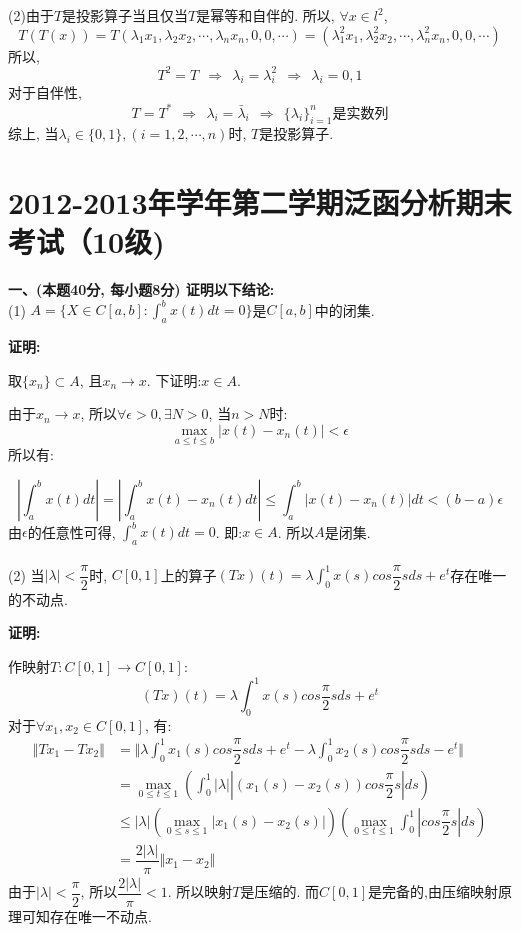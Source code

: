 \documentclass{article}
\begin{document}
(2)由于$T$是投影算子当且仅当$T$是幂等和自伴的. 所以, $\forall x \in l^2$,
$$ T(T(x)) = T(\lambda_1x_1, \lambda_2x_2, \cdots, \lambda_nx_n, 0, 0, \cdots) = (\lambda_1^2x_1, \lambda_2^2x_2, \cdots, \lambda_n^2x_n, 0, 0, \cdots) $$
所以, 
$$T^2 = T \ \ \Rightarrow \ \ \lambda_i = \lambda_i^2 \ \ \Rightarrow \ \ \lambda_i = 0, 1 $$
对于自伴性, 
$$ T = T^* \ \ \Rightarrow \ \ \lambda_i = \bar{\lambda}_i \ \ \Rightarrow \ \ \{\lambda_i \}_{i=1}^n\text{是实数列} $$
综上, 当$\lambda_i \in \{0, 1\}, (i=1,2, \cdots, n)$时, $T$是投影算子. 

\newpage



\section{2012-2013年学年第二学期泛函分析期末考试（10级)}
\textbf{一、(本题40分, 每小题8分) 证明以下结论:}  \\

(1) $A = \{ X\in C[a,b]: \int_a^b x(t)dt=0 \}$是$C[a,b]$中的闭集. 

\textbf{证明:}

取$\{ x_n \} \subset A$, 且$x_n \rightarrow x$. 下证明:$x \in A$.

由于$x_n \rightarrow x$, 所以$\forall \epsilon>0, \exists N>0$, 当$n>N$时:
 $$\max\limits_{ a \leq t \leq b} |x(t) - x_n(t)| < \epsilon$$
所以有:

$$ |\int_a^b x(t)dt| = |\int_a^b x(t) - x_n(t)dt| \leq \int_a^b |x(t) - x_n(t)|dt < (b-a)\epsilon  $$
由$\epsilon$的任意性可得, $\int_a^b x(t) dt =0$. 即:$x \in A$. 所以$A$是闭集. \\  \\  


(2) 当$|\lambda| < \dfrac{\pi}{2}$时, $C[0,1]$上的算子$(Tx)(t) = \lambda \int_0^1x(s)cos\dfrac{\pi}{2}s ds + e^t$存在唯一的不动点. 

\textbf{证明:}

作映射$T: C[0,1] \rightarrow C[0,1]$:
$$ (Tx)(t) = \lambda \int_0^1x(s)cos\dfrac{\pi}{2}s ds + e^t $$
对于$\forall x_1, x_2 \in C[0,1]$, 有:
\begin{align*}
\Vert Tx_1 - Tx_2 \Vert &= \Vert \lambda \int_0^1x_1(s)cos\dfrac{\pi}{2}s ds + e^t - \lambda \int_0^1x_2(s)cos\dfrac{\pi}{2}s ds - e^t  \Vert \\
       &= \max\limits_{0 \leq t \leq 1} (\int_0^1 |\lambda||(x_1(s) - x_2(s))cos\dfrac{\pi}{2}s|ds) \\
       &\leq |\lambda|(\max\limits_{0 \leq s \leq 1}|x_1(s) - x_2(s)|)(\max\limits_{0 \leq t \leq 1} \int_0^1 |cos\dfrac{\pi}{2}s| ds) \\
       &=\dfrac{2|\lambda|}{\pi} \Vert x_1 - x_2 \Vert
\end{align*}
由于$|\lambda| < \dfrac{\pi}{2}$, 所以$\dfrac{2|\lambda|}{\pi} <1$. 所以映射$T$是压缩的. 而$C[0,1]$是完备的,由压缩映射原理可知存在唯一不动点. \\  \\  
\end{document}
